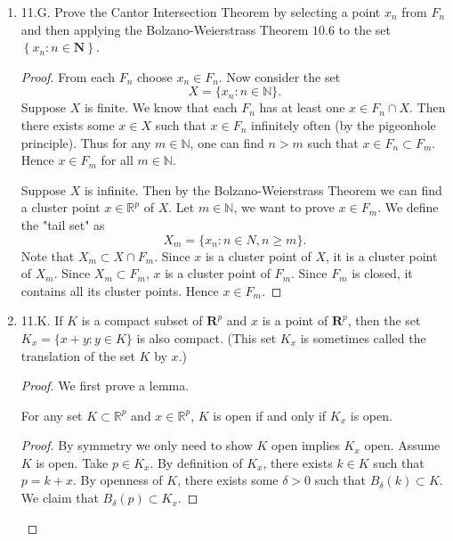 \begin{enumerate}
\begin{proof}(Using definition of compactness using cluster point)
	Let $A\subset F$ be infinite and bounded. Then $A \subset K$. Because $K$ is compact, there exists $x \in K$ such that $x$ is a cluster point of $A$. Because $F$ is closed, it contains all its cluster point. Hence $x \in F$.
\end{proof}

	\item 11.G. Prove the Cantor Intersection Theorem by selecting a point $x_n$ from $F_n$ and then applying the Bolzano-Weierstrass Theorem $10.6$ to the set $\left\{x_n: n \in \mathbf{N}\right\}$.
\begin{proof}
	From each  $F_n$ choose $x_n \in F_n$. Now consider the set \[
		X = \{x_n: n \in \mathbb{N}\} 
	.\]
	Suppose $X$ is finite. We know that each $F_n$ has at least one $x \in F_n \cap X$. Then there exists some $x \in X$ such that $x \in F_n$ infinitely often (by the pigeonhole principle). Thus for any $m \in \mathbb{N}$, one can find $n>m$ such that $x \in F_n \subset F_m$. Hence $x \in F_m$ for all $m \in \mathbb{N}$.

	Suppose $X$ is infinite. Then by the Bolzano-Weierstrass Theorem we can find a cluster point $x \in \mathbb{R}^p$ of $X$. Let $m \in \mathbb{N}$, we want to prove $x \in F_m$.
	We define the "tail set" as  \[
		X_m = \{x_n: n \in N, n \ge m\} 
	.\] 
	Note that $X_m \subset X \cap F_m$. Since $x$ is a cluster point of $X$, it is a cluster point of  $X_m$. Since $X_m \subset F_m$, $x$ is a cluster point of $F_m$. Since $F_m$ is closed, it contains all its cluster points. Hence $x \in F_m$.
\end{proof}

	\item 11.K. If $K$ is a compact subset of $\mathbf{R}^p$ and $x$ is a point of $\mathbf{R}^p$, then the set $K_x=\{x+y: y \in K\}$ is also compact. (This set $K_x$ is sometimes called the translation of the set $K$ by $x$.)
\begin{proof}
	
	We first prove a lemma.
\begin{lemma}
	For any set $K \subset \mathbb{R}^p$ and $x \in \mathbb{R}^p$, $K$ is open if and only if $K_x$ is open.
	\begin{proof}
		By symmetry we only need to show $K$ open implies $K_x$ open.
		Assume $K$ is open. Take $p \in K_x$. By definition of $K_x$, there exists $k \in K$ such that $p = k + x$. By openness of $K$, there exists some $\delta>0$ such that $B_\delta(k)\subset K$. We claim that $B_\delta(p)\subset K_x$.


\end{proof}
\end{lemma}
\end{proof}
\end{enumerate}
